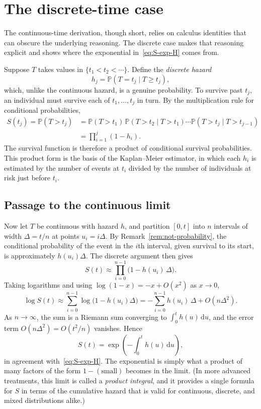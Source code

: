 \documentclass[11pt]{article}
\theoremstyle{definition}
\theoremstyle{plain}
\newcommand{\Prob}{\mathbb{P}}
\newcommand{\dd}{\,\mathrm{d}}
\begin{document}
\section{The discrete-time case}\label{sec:discrete}

The continuous-time derivation, though short, relies on calculus identities that can obscure the underlying reasoning. The discrete case makes that reasoning explicit and shows where the exponential in~\eqref{eq:S-exp-H} comes from.

Suppose $T$ takes values in $\{t_1 < t_2 < \cdots\}$. Define the \emph{discrete hazard}
\[
  h_j = \Prob(T = t_j \mid T \ge t_j),
\]
which, unlike the continuous hazard, is a genuine probability. To survive past $t_j$, an individual must survive each of $t_1, \dots, t_j$ in turn. By the multiplication rule for conditional probabilities,
\begin{align*}
  S(t_j) = \Prob(T > t_j)
  &= \Prob(T > t_1)\,\Prob(T > t_2 \mid T > t_1) \cdots
     \Prob(T > t_j \mid T > t_{j-1}) \\
  &= \prod_{i=1}^{j} (1 - h_i).
\end{align*}
The survival function is therefore a product of conditional survival probabilities. This product form is the basis of the Kaplan--Meier estimator, in which each $h_i$ is estimated by the number of events at $t_i$ divided by the number of individuals at risk just before $t_i$.

\subsection*{Passage to the continuous limit}

Now let $T$ be continuous with hazard $h$, and partition $[0, t]$ into $n$ intervals of width $\Delta = t/n$ at points $u_i = i\Delta$. By Remark~\ref{rem:not-probability}, the conditional probability of the event in the $i$th interval, given survival to its start, is approximately $h(u_i)\Delta$. The discrete argument then gives
\[
  S(t) \approx \prod_{i=0}^{n-1} \bigl(1 - h(u_i)\,\Delta\bigr).
\]
Taking logarithms and using $\log(1 - x) = -x + O(x^2)$ as $x \to 0$,
\[
  \log S(t) \approx \sum_{i=0}^{n-1} \log\bigl(1 - h(u_i)\Delta\bigr)
  = -\sum_{i=0}^{n-1} h(u_i)\,\Delta + O\!\left(n \Delta^2\right).
\]
As $n \to \infty$, the sum is a Riemann sum converging to $\int_0^t h(u)\dd u$, and the error term $O(n\Delta^2) = O(t^2/n)$ vanishes. Hence
\[
  S(t) = \exp\!\left(-\int_0^t h(u) \dd u\right),
\]
in agreement with~\eqref{eq:S-exp-H}. The exponential is simply what a product of many factors of the form $1 - (\text{small})$ becomes in the limit. (In more advanced treatments, this limit is called a \emph{product integral}, and it provides a single formula for $S$ in terms of the cumulative hazard that is valid for continuous, discrete, and mixed distributions alike.)
\end{document}
